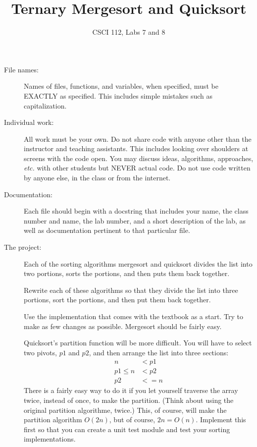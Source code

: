 \documentclass{article}
\title{Ternary Mergesort and Quicksort}
\author{CSCI 112, Labs 7 and 8}
\date{}
\begin{document}
\sloppy

\maketitle

\begin{description} 
\item[File names:]  Names of files, functions, and variables, 
when specified,
must be EXACTLY as specified.  This includes simple mistakes such
as capitalization.

\item[Individual work:]  All work must be your own.  Do not share
code with anyone other than the instructor and teaching assistants.
This includes looking over shoulders at screens with the code open.
You may discuss ideas, algorithms, approaches, {\em etc.} with
other students but NEVER actual code.  Do not use code
written by anyone else, in the class or from the internet.

\item[Documentation:] Each file should begin with a docstring
that includes your name, the class number and name, the lab
number, and  
a short description of the lab, as well as documentation pertinent
to that particular file.

\item[The project:]  Each of the sorting algorithms mergesort and quicksort
divides the list into two portions, sorts the portions, and then puts them
back together. 

Rewrite each of these algorithms so that they divide the list into three
portions, sort the portions, and then put them back together.

Use the implementation that comes with the textbook as a start.
Try to make as few changes as possible.  Mergesort should be
fairly easy.  

Quicksort's partition function will be more difficult.
You will have to select two pivots, $p1$ and $p2$, and then
arrange the list into three sections:
\begin{align*}
n &< p1\\
p1 \leq n &< p2\\
p2 &<= n
\end{align*}
There is a fairly easy way to do it if you let yourself traverse
the array twice, instead of once, to make the partition.
(Think about using the original partition algorithme, twice.)
This, of course, will make the partition algorithm $O(2n)$,
but of course, $2n = O(n)$.
Implement this first so that you can create a unit test module
and test your sorting implementations.


\end{description}
\end{document}
